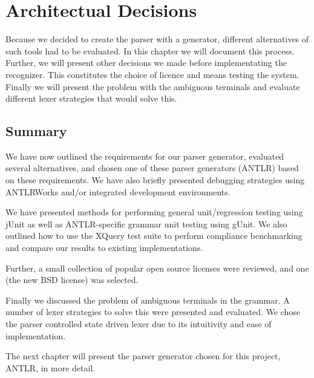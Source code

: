 \chapter{Architectual Decisions}
\label{chapter:method}
Because we decided to create the parser with a generator, different alternatives of such tools had to be evaluated. In this chapter we will document this process. Further, we will present other decisions we made before implementating the recognizer. This constitutes the choice of licence and means testing the system. Finally we will present the problem with the ambiguous terminals and evaluate different lexer strategies that would solve this.







\section{Summary}
We have now outlined the requirements for our parser generator, evaluated
several alternatives, and chosen one of these parser generators (ANTLR) based on
these requirements. We have also briefly presented debugging
strategies using ANTLRWorks and/or integrated development environments.

We have presented methods for performing general unit/regression testing
using jUnit as well as ANTLR-specific grammar unit testing using gUnit. We also
outlined how to use the XQuery test suite to perform compliance
benchmarking and compare our results to existing implementations.

Further, a small collection of popular open source licenses were reviewed, and
one (the new BSD license) was selected.

Finally we discussed the problem of ambiguous terminals in the grammar. A number of lexer strategies to solve this were presented and evaluated. We chose the parser controlled state driven lexer due to its intuitivity and ease of implementation.

The next chapter will present the parser generator chosen for this
project, ANTLR, in more detail.
